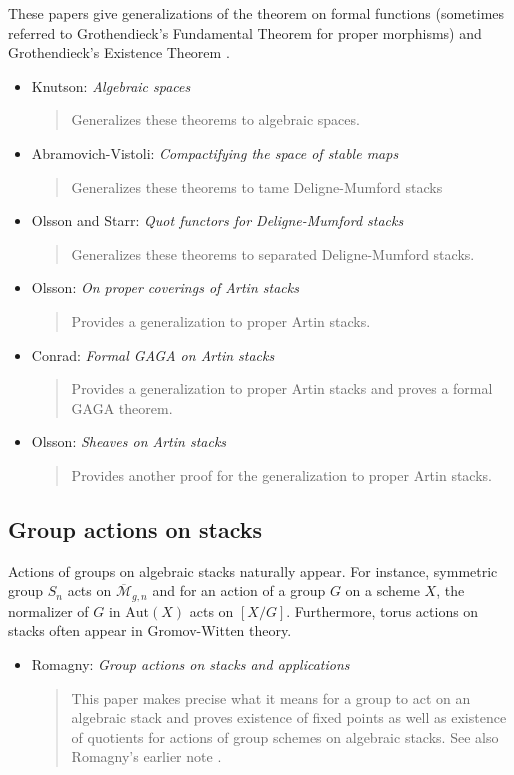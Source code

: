 \noindent
These papers give generalizations of the theorem on formal functions
\cite[III.4.1.5]{EGA} (sometimes referred to Grothendieck's Fundamental
Theorem for proper morphisms) and Grothendieck's Existence
Theorem \cite[III.5.1.4]{EGA}.
\begin{itemize}
\item Knutson: \emph{Algebraic spaces} \cite[Chapter V]{Kn}
\begin{quote}
Generalizes these theorems to algebraic spaces.
\end{quote}
\item Abramovich-Vistoli: \emph{Compactifying the space of stable maps}
\cite[A.1.1]{abramovich-vistoli}
\begin{quote}
Generalizes these theorems to tame Deligne-Mumford stacks
\end{quote}
\item Olsson and Starr: \emph{Quot functors for Deligne-Mumford stacks}
\cite{olsson-starr}
\begin{quote}
Generalizes these theorems to separated Deligne-Mumford stacks.
\end{quote}
\item Olsson: \emph{On proper coverings of Artin stacks}
\cite{olsson_proper}
\begin{quote}
Provides a generalization to proper Artin stacks.
\end{quote}
\item Conrad: \emph{Formal GAGA on Artin stacks} \cite{conrad_gaga}
\begin{quote}
Provides a generalization to proper Artin stacks and proves a formal
GAGA theorem.
\end{quote}
\item Olsson: \emph{Sheaves on Artin stacks} \cite{olsson_sheaves}
\begin{quote}
Provides another proof for the generalization to proper Artin stacks.
\end{quote}
\end{itemize}


\subsection{Group actions on stacks}
\label{subsection-group-actions}

\noindent
Actions of groups on algebraic stacks naturally appear.
For instance, symmetric group $S_n$ acts on $\overline{\mathcal{M}}_{g, n}$
and for an action of a group $G$ on a scheme $X$, the normalizer of $G$ in
$\text{Aut}(X)$ acts on $[X/G]$. Furthermore, torus actions on stacks
often appear in Gromov-Witten theory.
\begin{itemize}
\item Romagny: \emph{Group actions on stacks and applications}
\cite{romagny_actions}
\begin{quote}
This paper makes precise what it means for a group to act on an algebraic
stack and proves existence of fixed points as well as existence of quotients
for actions of group schemes on algebraic stacks. See also Romagny's earlier
note \cite{romagny_notes}.
\end{quote}
\end{itemize}

